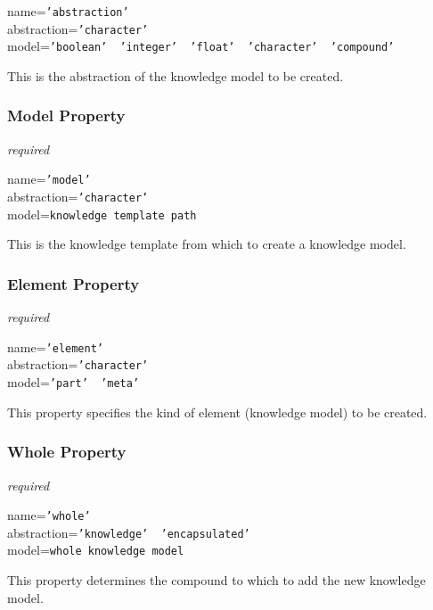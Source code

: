 name=\texttt{'abstraction'}\\
abstraction=\texttt{'character'}\\
model=\texttt{'boolean' \vline\ 'integer' \vline\ 'float' \vline\ 'character' \vline\ 'compound'}

This is the abstraction of the knowledge model to be created.

\subsubsection{Model Property}

\emph{required}

name=\texttt{'model'}\\
abstraction=\texttt{'character'}\\
model=\texttt{knowledge template path}

This is the knowledge template from which to create a knowledge model.

\subsubsection{Element Property}

\emph{required}

name=\texttt{'element'}\\
abstraction=\texttt{'character'}\\
model=\texttt{'part' \vline\ 'meta'}

This property specifies the kind of element (knowledge model) to be created.

\subsubsection{Whole Property}

\emph{required}

name=\texttt{'whole'}\\
abstraction=\texttt{'knowledge' \vline\ 'encapsulated'}\\
model=\texttt{whole knowledge model}

This property determines the compound to which to add the new knowledge model.
